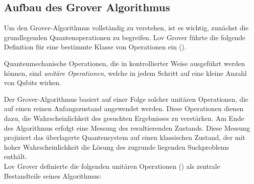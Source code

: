 \subsection{Aufbau des Grover Algorithmus}

Um den Grover-Algorithmus vollständig zu verstehen, ist es wichtig, zunächst die grundlegenden Quantenoperationen zu begreifen. Lov Grover führte die folgende Definition für eine bestimmte Klasse von Operationen ein (\cite[1-2]{zotero-1211}).

\begin{definition}
Quantenmechanische Operationen, die in kontrollierter Weise ausgeführt werden können, sind \emph{unitäre Operationen}, welche in jedem Schritt auf eine kleine Anzahl von Qubits wirken.
\end{definition}

Der Grover-Algorithmus basiert auf einer Folge solcher unitären Operationen, die auf einen reinen Anfangszustand angewendet werden. Diese Operationen dienen dazu, die Wahrscheinlichkeit des gesuchten Ergebnisses zu verstärken. Am Ende des Algorithmus erfolgt eine Messung des resultierenden Zustands. Diese Messung projiziert das überlagerte Quantensystem auf einen klassischen Zustand, der mit hoher Wahrscheinlichkeit die Lösung des zugrunde liegenden Suchproblems enthält.\\

Lov Grover definierte die folgenden unitären Operationen (\cite{zotero-1211}) als zentrale Bestandteile seines Algorithmus:

